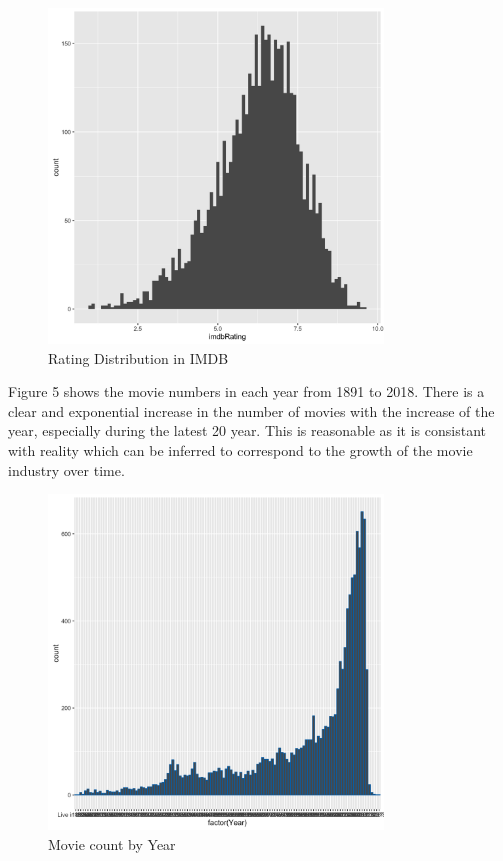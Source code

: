 \documentclass[conference]{IEEEtran}
\begin{document}
\begin{figure}
	\centering
	\includegraphics[width=3.5in]{rating_count.png}
	\caption{Rating Distribution in IMDB}
	\label{fig:side:a}
\end{figure}

Figure 5 shows the movie numbers in each year from 1891 to 2018. There is a clear and exponential increase in the number of movies with the increase of the year, especially during the latest 20 year. This is reasonable as it is consistant with reality which can be inferred to correspond to the growth of the movie industry over time.

\begin{figure}
	\centering
	\includegraphics[width=3.5in]{year_count.png}
	\caption{Movie count by Year}
	\label{fig:side:a}
\end{figure}
\end{document}
